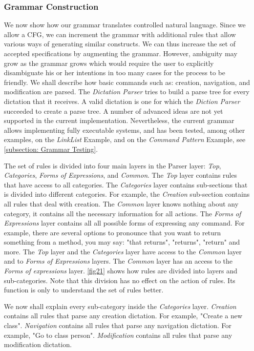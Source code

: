\subsubsection{Grammar Construction}
We now show how our grammar translates controlled natural language. Since we allow a CFG, we can increment the grammar with additional rules that allow various ways of generating similar constructs. We can thus increase the set of accepted specifications by augmenting the grammar. However, ambiguity may grow as the grammar grows which would require the user to explicitly disambiguate his or her intentions in too many cases for the process to be friendly. We shall describe how basic commands such as: creation, navigation, and modification are parsed. The \textit{Dictation Parser} tries to build a parse tree for every dictation that it receives. A valid dictation is one for which the \textit{Diction Parser} succeeded to create a parse tree. A number of advanced ideas are not yet supported in the current implementation. Nevertheless, the current grammar allows implementing fully executable systems, and has been tested, among other examples, on the \textit{LinkList} Example, and on the \textit{Command Pattern} Example, see \ref{subsection: Grammar Testing}.

The set of rules is divided into four main layers in the Parser layer: \textit{Top}, \textit{Categories}, \textit{Forms of Expressions}, and \textit{Common}. The \textit{Top} layer contains rules that have access to all categories. The \textit{Categories} layer contains sub-sections that is divided into different categories. For example, the \textit{Creation} sub-section contains all rules that deal with creation. The \textit{Common} layer knows nothing about any category, it contains all the necessary information for all actions. The \textit{Forms of Expressions} layer contains all all possible forms of expressing any command. For example, there are several options to pronounce that you want to return something from a method, you may say: "that returns", "returns", "return" and more. The \textit{Top} layer and the \textit{Categories} layer have access to the \textit{Common} layer and to \textit{Forms of Expressions} layers. The \textit{Common} layer has an access to the \textit{Forms of expressions} layer. \autoref{fig21} shows how rules are divided into layers and sub-categories. Note that this division has no effect on the action of rules. Its function is only to understand the set of rules better.

We now shall explain every sub-category inside the \textit{Categories} layer. \textit{Creation} contains all rules that parse any creation dictation. For example, "Create a new class". \textit{Navigation} contains all rules that parse any navigation dictation. For example, "Go to class person". \textit{Modification} contains all rules that parse any modification dictation.

